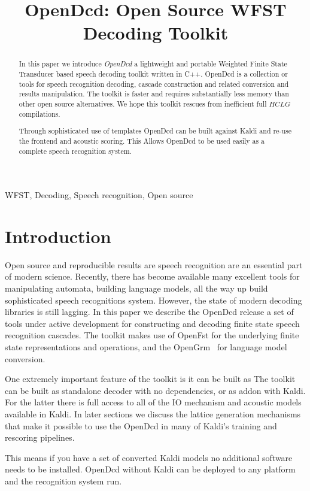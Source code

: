 \documentclass{article}
\title{OpenDcd: Open Source WFST Decoding Toolkit}
\begin{document}
%
\maketitle
%
\begin{abstract}
In this paper we introduce \emph{OpenDcd} a lightweight and portable Weighted Finite State
Transducer based speech decoding toolkit written in C++. OpenDcd is a collection or tools for speech
recognition decoding, cascade construction and related conversion and results manipulation.
The toolkit is faster and requires substantially less memory than other open source alternatives.
We hope this toolkit rescues from inefficient full $HCLG$ compilations.

Through sophisticated use of templates OpenDcd can be built against Kaldi and re-use the
frontend and acoustic scoring. This Allows OpenDcd to be used easily as a complete speech recognition system.

\end{abstract}
%
\begin{keywords}
WFST, Decoding, Speech recognition, Open source
\end{keywords}
%
\section{Introduction}
\label{sec:intro}
Open source and reproducible results are speech recognition are an essential
part of modern science. Recently, there has become available many excellent
tools for manipulating automata, building language models, all the way up
build sophisticated speech recognitions system.  However, the state of modern 
decoding libraries is still lagging. In this paper we describe the OpenDcd
release a set of tools under active development for constructing and decoding
finite state speech recognition cascades. The toolkit makes use of OpenFst for the 
underlying finite state representations
and operations, and the OpenGrm~\cite{roark12} for language model conversion.

One extremely important feature of the toolkit is it can be built as 
The toolkit can be built as standalone decoder with no dependencies, or as addon
with Kaldi. For the latter there is full access to all of the IO mechanism and 
acoustic models available in Kaldi. In later sections we discuss the lattice generation
mechanisms that make it possible to use the OpenDcd in many of Kaldi's training and
rescoring pipelines. 

This means if you have a set of converted Kaldi models no additional software needs
to be installed. OpenDcd without Kaldi can be deployed to any platform and the
recognition system run. 
\end{document}
